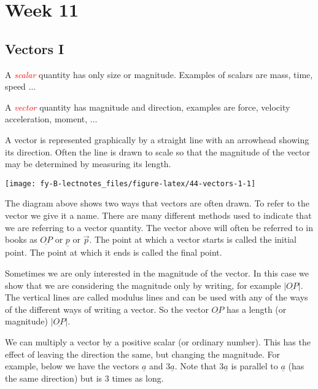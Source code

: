 \documentclass[
  11pt,
  oneside]{book}
\newcommand{\slide}{}
\theoremstyle{definition}
\theoremstyle{definition}
\theoremstyle{definition}
\theoremstyle{definition}
\theoremstyle{remark}
\begin{document}
\chapter{Week 11}\label{week-eleven}

\slide

\section{Vectors I}\label{vectors-i}

A \textcolor{red}{\em scalar} quantity has only size or magnitude. Examples of scalars are mass, time, speed \(\ldots\)

A \textcolor{red}{\em vector} quantity has magnitude and direction, examples are force, velocity acceleration, moment, \(\ldots\)

A vector is represented graphically by a straight line with an arrowhead showing its direction. Often the line is drawn to scale so that the magnitude of the vector may be determined by measuring its length.

\begin{center}\texttt{[image: fy-B-lectnotes\_files/figure-latex/44-vectors-1-1]} \end{center}

The diagram above shows two ways that vectors are often drawn. To refer to the vector we give it a name. There are many different methods used to indicate that we are referring to a vector quantity. The vector above will often be referred to in books as \(\underline{OP}\) or \(\underline p\) or \(\vec{p}\). The point at which a vector starts is called the initial point. The point at which it ends is called the final point.

Sometimes we are only interested in the magnitude of the vector. In this case we show that we are considering the magnitude only by writing, for example \(|\underline{OP}|\). The vertical lines are called modulus lines and can be used with any of the ways of the different ways of writing a vector. So the vector \(\underline{OP}\) has a length (or magnitude) \(|\underline{OP}|\).

We can multiply a vector by a positive scalar (or ordinary number). This has the effect of leaving the direction the same, but changing the magnitude. For example, below we have the vectors \(\underline a\) and \(3\underline a\). Note that \(3\underline a\) is parallel to \(\underline a\) (has the same direction) but is \(3\) times as long.
\end{document}
